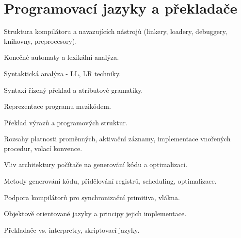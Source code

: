 \newpage
\section{Programovací jazyky a překladače}
\begin{pozadavky}
\begin{pitemize}
\item Struktura kompilátoru a navazujících nástrojů (linkery, loadery, debuggery, knihovny, preprocesory).
\item Konečné automaty a lexikální analýza.
\item Syntaktická analýza - LL, LR techniky.
\item Syntaxí řízený překlad a atributové gramatiky.
\item Reprezentace programu mezikódem.
\item Překlad výrazů a programových struktur.
\item Rozsahy platnosti proměnných, aktivační záznamy, implementace vnořených procedur, volací konvence.
\item Vliv architektury počítače na generování kódu a optimalizaci.
\item Metody generování kódu, přidělování registrů, scheduling, optimalizace.
\item Podpora kompilátorů pro synchronizační primitiva, vlákna.
\item Objektově orientované jazyky a principy jejich implementace.
\item Překladače vs. interpretry, skriptovací jazyky.
\end{pitemize}
\end{pozadavky}